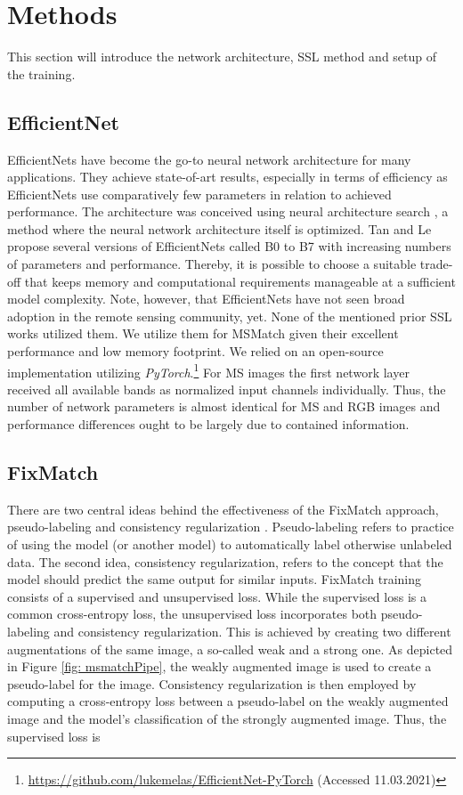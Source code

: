 \documentclass[journal]{IEEEtran}
\begin{document}
\section{Methods}
This section will introduce the network architecture, SSL method and setup of the training. 

\subsection{EfficientNet}
EfficientNets \cite{tan2019} have become the go-to neural network architecture for many applications. They achieve state-of-art results, especially in terms of efficiency as EfficientNets use comparatively few parameters in relation to achieved performance. The architecture was conceived using neural architecture search \cite{elsken2019neural}, a method where the neural network architecture itself is optimized. Tan and Le propose several versions of EfficientNets called B0 to B7 with increasing numbers of parameters and performance. Thereby, it is possible to choose a suitable trade-off that keeps memory and computational requirements manageable at a sufficient model complexity.
Note, however, that EfficientNets have not seen broad adoption in the remote sensing community, yet. None of the mentioned prior SSL works utilized them. We utilize them for MSMatch given their excellent performance and low memory footprint. We relied on an open-source implementation utilizing \textit{PyTorch}.\footnote{\url{https://github.com/lukemelas/EfficientNet-PyTorch} (Accessed 11.03.2021)}
For MS images the first network layer received all available bands as normalized input channels individually. Thus, the number of network parameters is almost identical for MS and RGB images and performance differences ought to be largely due to contained information.

\subsection{FixMatch}

There are two central ideas behind the effectiveness of the FixMatch approach, pseudo-labeling and consistency regularization \cite{bachman2014,kurakin2020}. Pseudo-labeling refers to practice of using the model (or another model) to automatically label otherwise unlabeled data. The second idea, consistency regularization, refers to the concept that the model should predict the same output for similar inputs. FixMatch training consists of a supervised and unsupervised loss. While the supervised loss is a common cross-entropy loss, the unsupervised loss incorporates both pseudo-labeling and consistency regularization.
This is achieved by creating two different augmentations of the same image, a so-called weak and a strong one. As depicted in Figure \ref{fig: msmatchPipe}, the weakly augmented image is used to create a pseudo-label for the image. Consistency regularization is then employed by computing a cross-entropy loss between a pseudo-label on the weakly augmented image and the model's classification of the strongly augmented image.
Thus, the supervised loss is
\end{document}
